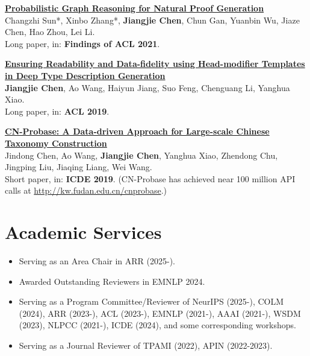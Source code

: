 \documentclass{resume}
\begin{document}
\begin{enumerate}[label={[\arabic*]}]
  \item \textbf{\href{https://jiangjiechen.github.io/publication/probr/}{Probabilistic Graph Reasoning for Natural Proof Generation}}\\
  \label{paper:probr}
  Changzhi Sun*, Xinbo Zhang*, \textbf{Jiangjie Chen}, Chun Gan, Yuanbin Wu, Jiaze Chen, Hao Zhou, Lei Li. \\
  Long paper, in: \textbf{Findings of ACL 2021}.
  
  \item \textbf{\href{https://jiangjiechen.github.io/publication/hedmodgen}{Ensuring Readability and Data-fidelity using Head-modifier Templates in Deep Type Description Generation}}\\
  \label{paper:hedmod}
  \textbf{Jiangjie Chen}, Ao Wang, Haiyun Jiang, Suo Feng, Chenguang Li, Yanghua Xiao.\\
  Long paper, in: \textbf{ACL 2019}.
  
  \item \textbf{\href{https://jiangjiechen.github.io/publication/cnprobase/}{CN-Probase: A Data-driven Approach for Large-scale Chinese Taxonomy Construction}}\\ 
  \label{paper:cnprobase}
  Jindong Chen, Ao Wang, \textbf{Jiangjie Chen}, Yanghua Xiao, Zhendong Chu, Jingping Liu, Jiaqing Liang, Wei Wang. \\
  Short paper, in: \textbf{ICDE 2019}. (CN-Probase has achieved near 100 million API calls at \url{http://kw.fudan.edu.cn/cnprobase}.)
\end{enumerate}


\section{Academic Services}

\begin{itemize}
  \item Serving as an Area Chair in ARR (2025-).
  \item Awarded Outstanding Reviewers in EMNLP 2024.
  \item Serving as a Program Committee/Reviewer of NeurIPS (2025-), COLM (2024), ARR (2023-), ACL (2023-), EMNLP (2021-), AAAI (2021-), WSDM (2023), NLPCC (2021-), ICDE (2024), and some corresponding workshops.
  \item Serving as a Journal Reviewer of TPAMI (2022), APIN (2022-2023).
\end{itemize}

\thispagestyle{empty}
\end{document}
